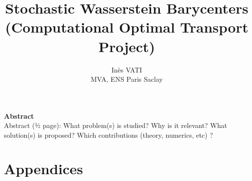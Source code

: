 \documentclass[a4paper, 11pt]{article}
\title{Stochastic Wasserstein Barycenters (Computational Optimal Transport Project)}
\author{Inès VATI \email{ines.vati@eleves.enpc.fr} \\ MVA, ENS Paris Saclay }
\begin{document}
\maketitle

\begin{center}
    \textbf{Abstract} \\
     
Abstract (½ page): 
What problem(s) is studied? 
Why is it relevant? 
What solution(s) is proposed? 
Which contributions (theory, numerics, etc) ? 
\end{center}
\newpage





 





\printbibliography

\newpage
\section*{Appendices}
\end{document}

